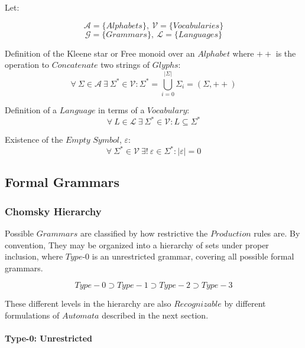 \documentclass{article}
\begin{document}
Let:

\[
    \mathcal{A} = \{ Alphabets \},\: \mathcal{V} = \{ Vocabularies \}
\] \[
    \mathcal{G} = \{ Grammars \},\: \mathcal{L} = \{ Languages \}
\]

    \begin{description}

    \item Definition of the Kleene star or Free monoid over an
      $Alphabet$ where $++$ is the operation to $Concatenate$ two
      strings of $Glyphs$:
    \[
        \forall \: \Sigma \in \mathcal{A} \:
        \exists \: \Sigma^* \in \mathcal{V}
        : \Sigma^* = \bigcup_{i=0}^{|\Sigma|} \Sigma_i
        = (\Sigma,++)
    \]

    \item Definition of a $Language$ in terms of a $Vocabulary$:
    \[
        \forall \: L \in \mathcal{L} \:
        \exists \: \Sigma^* \in \mathcal{V}
        : L \subseteq \Sigma^*
    \]

    \item Existence of the $Empty$ $Symbol$, $\varepsilon$:
    \[
        \forall \: \Sigma^* \in \mathcal{V} \:
        \exists ! \: \varepsilon \in \Sigma^*
        : |\varepsilon|=0
    \]

    \end{description}

\subsection{Formal Grammars}

\subsubsection{Chomsky Hierarchy}

Possible $Grammars$ are classified by how restrictive the $Production$
rules are. By convention, They may be organized into a hierarchy of
sets under proper inclusion, where $Type$-$0$ is an unrestricted
grammar, covering all possible formal grammars.

\[
    Type-0 \supset Type-1 \supset Type-2 \supset Type-3
\]

 These different levels in the hierarchy are also $Recognizable$ by
 different formulations of $Automata$ described in the next section.

\paragraph{Type-0: Unrestricted}
\end{document}
